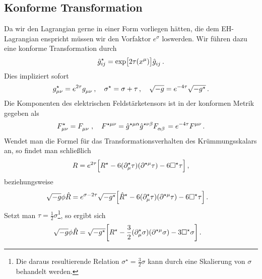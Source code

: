 \subsection{Konforme Transformation}
Da wir den Lagrangian gerne in einer Form vorliegen hätten, die dem
EH-Lagrangian enspricht müssen wir den Vorfaktor $e^{\sigma}$ loswerden. 
Wir führen dazu eine konforme Transformation durch
\begin{equation}
\tensor*{\hat{g}}{*^\star*_i*_j}=\exp\left[{2\tau\left(\tensor{x}{^\mu}\right)}\right]\tensor{\hat{g}}{_i_j}\,.
\end{equation}
Dies impliziert sofort
\begin{equation}
\tensor*{g}{*^\star*_\mu*_\nu}=e^{2\tau}\tensor{g}{_\mu_\nu}\,,\quad\sigma^\star
=\sigma+\tau\,,\quad \sqrt{-g}=e^{-4\tau}\sqrt{-g^\star}\,.
\end{equation}
Die Komponenten des elektrischen Feldstärketensors ist in der konformen Metrik
gegeben als
\begin{equation}
\tensor*{F}{*^\star_\mu_\nu}=\tensor{F}{_\mu_\nu}\,,\quad\tensor*{F}{*^\star^\mu^\nu}
=\tensor*{\hat{g}}{*^\star*^\mu*^\alpha}\tensor*{\hat{g}}{*^\star*^\nu*^\beta}\tensor{F}{_\alpha_\beta}
=e^{-4\tau}\tensor{F}{^\mu^\nu}\,.
\end{equation}
Wendet man die Formel für das Transformationsverhalten des Krümmungsskalars an,
so findet man schließlich
\begin{equation}
R=e^{2\tau}\left[R^\star-6(\tensor*{\partial}{^\star_\mu}\tau)(\tensor{\partial}{^\star^\mu}\tau)
-6\square^\star\tau\right]\,,
\end{equation}
beziehungsweise
\begin{equation}
\begin{split}
\sqrt{-g}\phi
\hat{R}
&=e^{\sigma-2\tau}\sqrt{-g^\star}\left[\hat{R}^\star
-6(\tensor*{\partial}{^\star_\mu}\tau)(\tensor{\partial}{^\star^\mu}\tau)
-6\square^\star\tau\right]\,.
\end{split}
\end{equation}
Setzt man $\tau = \frac{1}{2}\sigma$\footnote{Die daraus resultierende
Relation $\sigma^\star=\frac{3}{2}\sigma$ kann durch eine Skalierung von
$\sigma$ behandelt werden.}, so ergibt sich
\begin{equation}
\begin{split}
\sqrt{-g}\phi
\hat{R}&=\sqrt{-g^\star}\left[R^\star
-\frac{3}{2}(\tensor*{\partial}{^\star_\mu}\sigma)(\tensor{\partial}{^\star^\mu}\sigma)
-3\square^\star\sigma\right]\,.
\end{split}
\end{equation}
